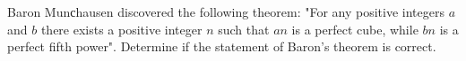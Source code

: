 Baron Munсhausen discovered the following theorem: "For any positive integers $a$ and  $b$ there exists a positive integer $n$ such that $an$ is a perfect cube, while $bn$ is a perfect fifth power". Determine if the statement of Baron’s theorem is correct.